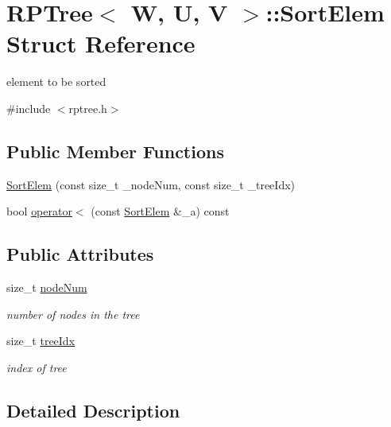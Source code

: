 \hypertarget{structRPTree_1_1SortElem}{\section{R\-P\-Tree$<$ W, U, V $>$\-:\-:Sort\-Elem Struct Reference}
\label{structRPTree_1_1SortElem}
}


element to be sorted  




{\ttfamily \#include $<$rptree.\-h$>$}

\subsection*{Public Member Functions}
\begin{DoxyCompactItemize}
\item 
\hyperlink{structRPTree_1_1SortElem_a412356ab658c5bef7ca7a4131ad401d2}{Sort\-Elem} (const size\-\_\-t \-\_\-node\-Num, const size\-\_\-t \-\_\-tree\-Idx)
\item 
bool \hyperlink{structRPTree_1_1SortElem_a8cb84601b41909e606b523d6e93e45c6}{operator$<$} (const \hyperlink{structRPTree_1_1SortElem}{Sort\-Elem} \&\-\_\-a) const 
\end{DoxyCompactItemize}
\subsection*{Public Attributes}
\begin{DoxyCompactItemize}
\item 
size\-\_\-t \hyperlink{structRPTree_1_1SortElem_a01afd7ad0ab2b99cfc8452e1adb9b27d}{node\-Num}
\begin{DoxyCompactList}\small\item\em number of nodes in the tree \end{DoxyCompactList}\item 
size\-\_\-t \hyperlink{structRPTree_1_1SortElem_a9d1b22375e2f64c3663d55f5c278ae02}{tree\-Idx}
\begin{DoxyCompactList}\small\item\em index of tree \end{DoxyCompactList}\end{DoxyCompactItemize}


\subsection{Detailed Description}
